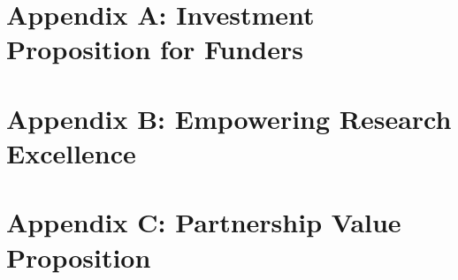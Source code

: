 \documentclass{article}
\begin{document}
\appendix

\section{Appendix A: Investment Proposition for Funders}


\section{Appendix B: Empowering Research Excellence}


\section{Appendix C: Partnership Value Proposition}

\end{document}
